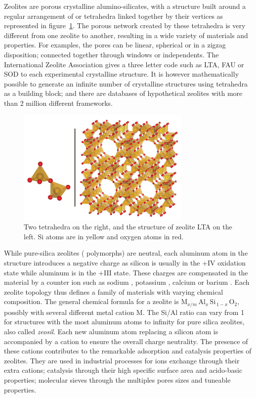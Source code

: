 \documentclass[thesis]{subfiles}
\begin{document}
Zeolites are porous crystalline alumino-silicates, with a structure built around
a regular arrangement of  or  tetrahedra linked together by
their vertices as represented in figure~\ref{fig:zeolite-building-block}. The
porous network created by these tetrahedra is very different from one zeolite to
another, resulting in a wide variety of materials and properties. For examples,
the pores can be linear, spherical or in a zigzag disposition; connected
together through windows or independents. The International Zeolite
Association\cite{iza-website} gives a three letter code such as LTA, FAU or SOD
to each experimental crystalline structure. It is however mathematically
possible to generate an infinite number of crystalline structures using
tetrahedra as a building block; and there are databases of hypothetical zeolites
with more than 2 million different frameworks\cite{hypothetical-zeolites}.

\begin{figure}[ht]
    \centering
    \includegraphics[width=0.75\textwidth]{figures/cited/zeolite-building-blocks}
    \caption{Two  tetrahedra on the right, and the structure of zeolite
    LTA on the left. Si atoms are in yellow and oxygen atoms in red.}
    \label{fig:zeolite-building-block}
\end{figure}

While pure-silica zeolites ( polymorphs) are neutral, each aluminum
atom in the structure introduces a negative charge as silicon is usually in the
+IV oxidation state while aluminum is in the +III state. These charges are
compensated in the material by a counter ion such as sodium , potassium
, calcium  or barium . Each zeolite topology thus
defines a family of materials with varying chemical composition. The general
chemical formula for a zeolite is $\text{M}_{x/m}\, \text{Al}_x\,
\text{Si}_{\,1-x}\, \text{O}_2$, possibly with several different metal cation M.
The Si/Al ratio can vary from 1 for structures with the most aluminum atoms to
infinity for pure silica zeolites, also called \emph{zeosil}. Each new aluminum
atom replacing a silicon atom is accompanied by a cation to ensure the overall
charge neutrality. The presence of these cations contributes to the remarkable
adsorption and catalysis properties of zeolites. They are used in industrial
processes for ions exchange through their extra cations; catalysis through their
high specific surface area and acido-basic properties; molecular sieves through
the multiples pores sizes and tuneable properties.
\end{document}
